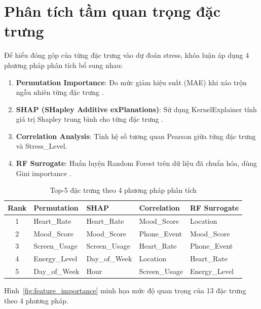 
\section{Phân tích tầm quan trọng đặc trưng}
\label{sec:feature_importance_results}

Để hiểu đóng góp của từng đặc trưng vào dự đoán stress, khóa luận áp dụng 4 phương pháp phân tích bổ sung nhau:

\begin{enumerate}
    \item \textbf{Permutation Importance}: Đo mức giảm hiệu suất (MAE) khi xáo trộn ngẫu nhiên từng đặc trưng \cite{fisher2019permutation}.
    \item \textbf{SHAP (SHapley Additive exPlanations)}: Sử dụng KernelExplainer tính giá trị Shapley trung bình cho từng đặc trưng \cite{lundberg2017shap}.
    \item \textbf{Correlation Analysis}: Tính hệ số tương quan Pearson giữa từng đặc trưng và Stress\_Level.
    \item \textbf{RF Surrogate}: Huấn luyện Random Forest trên dữ liệu đã chuẩn hóa, dùng Gini importance \cite{breiman2001random}.
\end{enumerate}

\begin{table}[H]
\centering
\caption{Top-5 đặc trưng theo 4 phương pháp phân tích}
\label{tab:feature_importance_top5}
\small
\begin{tabular}{|c|l|l|l|l|}
\hline
\textbf{Rank} & \textbf{Permutation} & \textbf{SHAP} & \textbf{Correlation} & \textbf{RF Surrogate} \\
\hline
1 & Heart\_Rate       & Heart\_Rate       & Mood\_Score   & Location \\
2 & Mood\_Score        & Mood\_Score        & Phone\_Event  & Mood\_Score \\
3 & Screen\_Usage      & Screen\_Usage      & Heart\_Rate   & Phone\_Event \\
4 & Energy\_Level      & Day\_of\_Week      & Location      & Heart\_Rate \\
5 & Day\_of\_Week      & Hour              & Screen\_Usage & Energy\_Level \\
\hline
\end{tabular}
\end{table}

Hình~\ref{fig:feature_importance} minh họa mức độ quan trọng của 13 đặc trưng theo 4 phương pháp.

